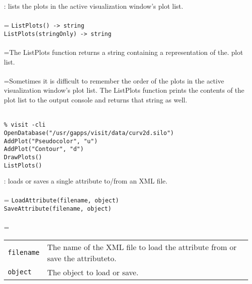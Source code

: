 \documentclass[10pt,a4paper]{report}
\begin{document}
{}
: lists the plots in the active visualization window's plot list.\\[-3mm]

 \\ 
\hangindent=\parindent 
\verb!ListPlots() -> string!\\ 
\verb!ListPlots(stringOnly) -> string!\\ [-3mm]

 \\ 
\hangindent=\parindent The ListPlots function returns a string containing a representation of the. plot list. \\[-3mm] 

 \\ 
\hangindent=\parindent Sometimes it is difficult to remember the order of the plots in the active visualization window's plot list. The ListPlots function prints the contents of the plot list to the output console and returns that string as well. \\[-3mm] 

\\[-6mm]
\begin{verbatim}% visit -cli
OpenDatabase("/usr/gapps/visit/data/curv2d.silo")
AddPlot("Pseudocolor", "u")
AddPlot("Contour", "d")
DrawPlots()
ListPlots()
\end{verbatim}
\newpage


{}
: loads or saves a single attribute to/from an XML file.\\[-3mm]

 \\ 
\hangindent=\parindent 
\verb!LoadAttribute(filename, object)!\\ 
\verb!SaveAttribute(filename, object)!\\ [-3mm]

 \\ 
\hangindent=\parindent 
\begin{tabular}{lp{9cm}}
\verb!filename! & The name of the XML file to load the attribute from or save the attributeto. \\
\verb!object! & The object to load or save. \\
\end{tabular} \\[-2mm]
\end{document}
